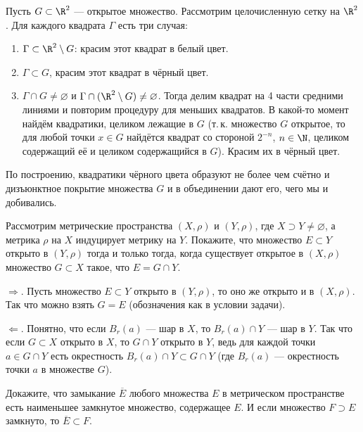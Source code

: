 \begin{solution}
    Пусть $G \subset \R^2$ --- открытое множество. Рассмотрим целочисленную сетку на $\R^2$. Для каждого квадрата $\Gamma$ есть три случая:
    \begin{enumerate}[nolistsep]
        \item $\Gamma \subset \R^2 \setminus G$: красим этот квадрат в белый цвет.
        \item $\Gamma \subset G$, красим этот квадрат в чёрный цвет.
        \item $\Gamma \cap G \ne \varnothing$ и $\Gamma \cap (\R^2 \setminus G) \ne \varnothing$. Тогда делим квадрат на 4 части средними линиями и повторим процедуру для меньших квадратов. В какой-то момент найдём квадратики, целиком лежащие в $G$ (т.\,к. множество $G$ открытое, то для любой точки $x \in G$ найдётся квадрат со стороной $2^{-n}$, $n \in \N$, целиком содержащий её и целиком содержащийся в $G$). Красим их в чёрный цвет.
    \end{enumerate}

    По построению, квадратики чёрного цвета образуют не более чем счётно и дизъюнктное покрытие множества $G$ и в объединении дают его, чего мы и добивались.
\end{solution}

\begin{problem}[52]
    Рассмотрим метрические пространства $(X, \rho)$ и $(Y, \rho)$, где $X \supset Y \ne \varnothing$, а метрика $\rho$ на $X$ индуцирует метрику на $Y$. Покажите, что множество $E \subset Y$ открыто в $(Y, \rho)$ тогда и только тогда, когда существует открытое в $(X, \rho)$ множество $G \subset X$ такое, что $E = G \cap Y$.
\end{problem}

\begin{solution}
    $\Rightarrow$. Пусть множество $E \subset Y$ открыто в $(Y, \rho)$, то оно же открыто и в $(X, \rho)$. Так что можно взять $G = E$ (обозначения как в условии задачи).
    
    $\Leftarrow$. Понятно, что если $B_r(a)$ --- шар в $X$, то $B_r(a) \cap Y$ --- шар в $Y$. Так что если $G \subset X$ открыто в $X$, то $G \cap Y$ открыто в $Y$, ведь для каждой точки $a \in G \cap Y$ есть окрестность $B_r(a) \cap Y \subset G \cap Y$ (где $B_r(a)$ --- окрестность точки $a$ в множестве $G$).
\end{solution}

\begin{problem}[53]
    Докажите, что замыкание $\overline{E}$ любого множества $E$ в метрическом пространстве есть наименьшее замкнутое множество, содержащее $E$. И если множество $F \supset E$ замкнуто, то $\overline{E} \subset F$.
\end{problem}

